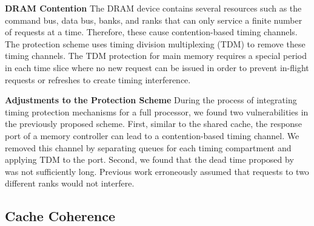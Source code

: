 \textbf{DRAM Contention}
The DRAM device contains several resources such as the command bus, data
bus, banks, and ranks that can only service a finite number of requests at a 
time. Therefore, these cause contention-based timing channels.
The protection scheme uses timing division multiplexing (TDM) to remove these
timing channels. The TDM protection for main memory requires a special period 
in each time slice where no new request can be issued in order to prevent
in-flight requests or refreshes to create timing interference.


\textbf{Adjustments to the Protection Scheme}
During the process of integrating timing protection mechanisms for a full
processor, we found two vulnerabilities in the previously proposed scheme.
First, similar to the shared cache, the response port of a memory controller
can lead to a contention-based timing channel. We removed this channel by
separating queues for each timing compartment and applying TDM to the port.
Second, we found that the dead time proposed by ~\cite{ushpca14} was not 
sufficiently long. Previous work erroneously assumed that requests to two
different ranks would not interfere.

\subsection{Cache Coherence}

